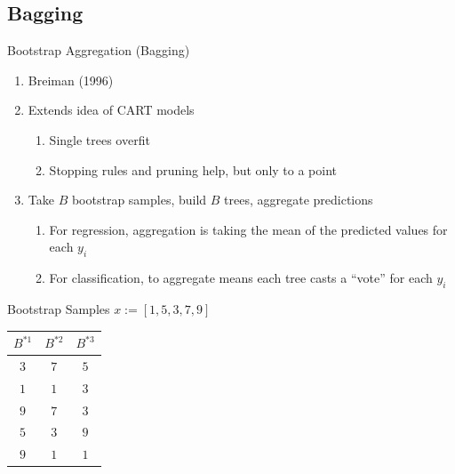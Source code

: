 \documentclass[pdf]{beamer}
\begin{document}
	\subsection{Bagging}
		\begin{frame}{Bootstrap Aggregation (Bagging)}
			\begin{enumerate}
				\item Breiman (1996)
				\item Extends idea of CART models
					\begin{enumerate}[1]
						\item Single trees overfit
						\item Stopping rules and pruning help, but only to a point
					\end{enumerate}
				\item Take $B$ bootstrap samples, build $B$ trees, aggregate predictions
					\begin{enumerate}[1]
						\item For regression, aggregation is taking the mean of the predicted values for each $y_i$
						\item For classification, to aggregate means each tree casts a ``vote'' for each $y_i$
					\end{enumerate}
			\end{enumerate}
    		\end{frame}
	
		\begin{frame}{Bootstrap Samples}
		$x := [1, 5, 3, 7, 9]$
		\begin{table}
		\begin{tabular}{c c c}
			\hline
			$B^{*1}$	& $B^{*2}$& $B^{*3}$  \\
			\hline
			$3$ 	& $7$ 	& $5$  \\
			$1$ 	& $1$ 	& $3$ \\
			$9$	& $7$	& $3$ \\
			$5$ 	& $3$ 	& $9$ \\
			$9$	& $1$	& $1$ \\
			\hline
		\end{tabular}
		\end{table}
		\end{frame}
		
\end{document}

